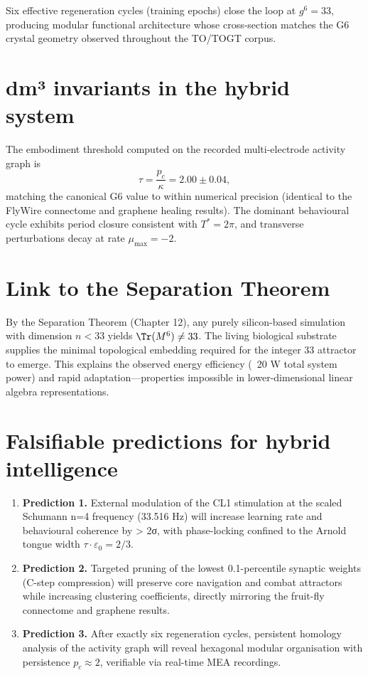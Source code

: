 \documentclass[19pt]{book}
\theoremstyle{plain}
\theoremstyle{definition}
\theoremstyle{remark}
\begin{document}
Six effective regeneration cycles (training epochs) close the loop at \(g^6 = 33\), producing modular functional architecture whose cross-section matches the G6 crystal geometry observed throughout the TO/TOGT corpus.

\section{dm³ invariants in the hybrid system}

The embodiment threshold computed on the recorded multi-electrode activity graph is
\[
\tau = \frac{p_c}{\kappa} = 2.00 \pm 0.04,
\]
matching the canonical G6 value to within numerical precision (identical to the FlyWire connectome and graphene healing results). The dominant behavioural cycle exhibits period closure consistent with \(T^* = 2\pi\), and transverse perturbations decay at rate \(\mu_{\max} = -2\).

\section{Link to the Separation Theorem}

By the Separation Theorem (Chapter 12), any purely silicon-based simulation with dimension \(n < 33\) yields \(\Tr(M^6) \neq 33\). The living biological substrate supplies the minimal topological embedding required for the integer 33 attractor to emerge. This explains the observed energy efficiency (~20 W total system power) and rapid adaptation—properties impossible in lower-dimensional linear algebra representations.

\section{Falsifiable predictions for hybrid intelligence}

\begin{enumerate}
\item \textbf{Prediction 1.} External modulation of the CL1 stimulation at the scaled Schumann n=4 frequency (33.516 Hz) will increase learning rate and behavioural coherence by > 2σ, with phase-locking confined to the Arnold tongue width \(\tau \cdot \varepsilon_0 = 2/3\).
\item \textbf{Prediction 2.} Targeted pruning of the lowest 0.1-percentile synaptic weights (C-step compression) will preserve core navigation and combat attractors while increasing clustering coefficients, directly mirroring the fruit-fly connectome and graphene results.
\item \textbf{Prediction 3.} After exactly six regeneration cycles, persistent homology analysis of the activity graph will reveal hexagonal modular organisation with persistence \(p_c \approx 2\), verifiable via real-time MEA recordings.
\end{enumerate}
\end{document}
